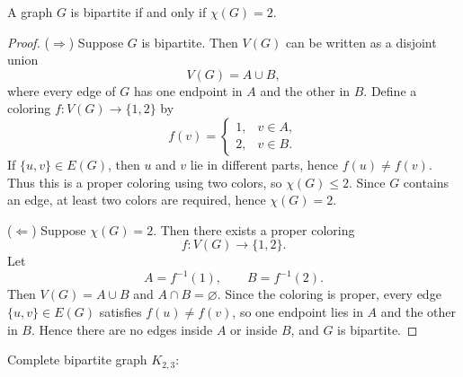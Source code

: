 \documentclass[11pt, a4paper]{ctexrep}
\begin{document}
\begin{corollary}
    A graph $G$ is bipartite if and only if $\chi(G)=2$.
\end{corollary}

\begin{proof}
    ($\Rightarrow$) Suppose $G$ is bipartite. Then $V(G)$ can be written as a disjoint union
    \[
        V(G)=A\cup B,
    \]
    where every edge of $G$ has one endpoint in $A$ and the other in $B$.
    Define a coloring $f:V(G)\to\{1,2\}$ by
    \[
        f(v)=
        \begin{cases}
            1, & v\in A, \\
            2, & v\in B.
        \end{cases}
    \]
    If $\{u,v\} \in E(G)$, then $u$ and $v$ lie in different parts, hence $f(u)\neq f(v)$.
    Thus this is a proper coloring using two colors, so $\chi(G)\le 2$.
    Since $G$ contains an edge, at least two colors are required, hence $\chi(G)=2$.

    ($\Leftarrow$) Suppose $\chi(G)=2$. Then there exists a proper coloring
    \[
        f:V(G)\to\{1,2\}.
    \]
    Let
    \[
        A=f^{-1}(1), \qquad B=f^{-1}(2).
    \]
    Then $V(G)=A\cup B$ and $A\cap B=\varnothing$.
    Since the coloring is proper, every edge $\{u,v\} \in E(G)$ satisfies $f(u)\neq f(v)$,
    so one endpoint lies in $A$ and the other in $B$.
    Hence there are no edges inside $A$ or inside $B$, and $G$ is bipartite.
\end{proof}

\begin{example}
    Complete bipartite graph $K_{2,3}$:
    \begin{center}
    \end{center}
\end{example}
\end{document}
